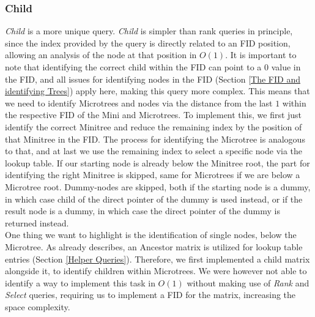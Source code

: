 \documentclass{article}
\begin{document}
\subsubsection{Child} \label{Child}
\textit{Child} is a more unique query. \textit{Child} is simpler than rank queries in principle, since the index provided by the query is directly related to an FID position, allowing an analysis of the node at that position in $O(1)$. It is important to note that identifying the correct child within the FID can point to a 0 value in the FID, and all issues for identifying nodes in the FID (Section \ref{The FID and identifying Trees}) apply here, making this query more complex.
This means that we need to identify Microtrees and nodes via the distance from the last $1$ within the respective FID of the Mini and Microtrees. To implement this, we first just identify the correct Minitree and reduce the remaining index by the position of that Minitree in the FID.
The process for identifying the Microtree is analogous to that, and at last we use the remaining index to select a specific node via the lookup table. If our starting node is already below the Minitree root, the part for identifying the right Minitree is skipped, same for Microtrees if we are below a Microtree root.
Dummy-nodes are skipped, both if the starting node is a dummy, in which case child of the direct pointer of the dummy is used instead, or if the result node is a dummy, in which case the direct pointer of the dummy is returned instead.\\
One thing we want to highlight is the identification of single nodes, below the Microtree. As \cite{farzanMunro} already describes, an Ancestor matrix is utilized for lookup table entries (Section \ref{Helper Queries}). Therefore, we first implemented a child matrix alongside it, to identify children within Microtrees. We were however not able to identify a way to implement this task in $O(1)$ without making use of \textit{Rank} and \textit{Select} queries, requiring us to implement a FID for the matrix, increasing the space complexity.
\end{document}
